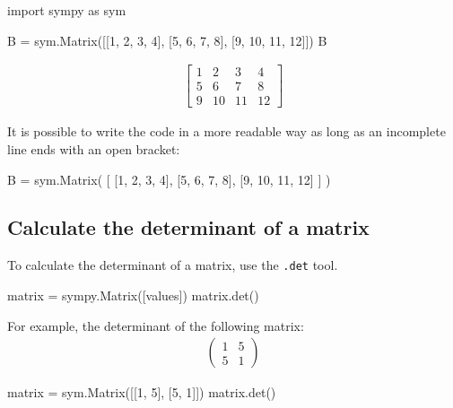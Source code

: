 \begin{pyin}
import sympy as sym

B = sym.Matrix([[1, 2, 3, 4], [5, 6, 7, 8], [9, 10, 11, 12]])
B
\end{pyin}




\begin{equation*}
\begin{split}\displaystyle \left[\begin{matrix}1 & 2 & 3 & 4\\5 & 6 & 7 & 8\\9 & 10 & 11 & 12\end{matrix}\right]\end{split}
\end{equation*}

\begin{note}
It is possible to write the code in a more readable way as long as an incomplete
line ends with an open bracket:
\end{note}


\begin{pyin}
B = sym.Matrix(
    [
        [1, 2, 3, 4],
        [5, 6, 7, 8],
        [9, 10, 11, 12]
    ]
)
\end{pyin}


\subsection{Calculate the determinant of a matrix}
\label{\detokenize{tools-for-mathematics/04-matrices/how/main:calculate-the-determinant-of-a-matrix}}

To calculate the determinant of a matrix, use the \texttt{.det} tool.

\begin{pyin}
matrix = sympy.Matrix([values])
matrix.det()
\end{pyin}



For example, the determinant of the following matrix:
\begin{equation*}
\begin{split}
    \begin{pmatrix}
    1 & 5\\
    5 & 1
    \end{pmatrix}
\end{split}
\end{equation*}



\begin{pyin}
matrix = sym.Matrix([[1, 5], [5, 1]])
matrix.det()
\end{pyin}




